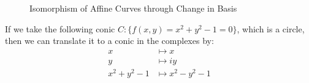 \begin{figure}[H]
{
    }
    \caption{Isomorphism of Affine Curves through Change in Basis}
\end{figure}

If we take the following conic $C: \{f(x,y) = x^2 + y^2 - 1 = 0\}$, which is a circle, then we can translate it to a conic in the complexes by:
\begin{align*}
    x &\mapsto x\\
    y &\mapsto iy\\
    x^2 + y^2 - 1 &\mapsto x^2 - y^2 - 1
\end{align*}